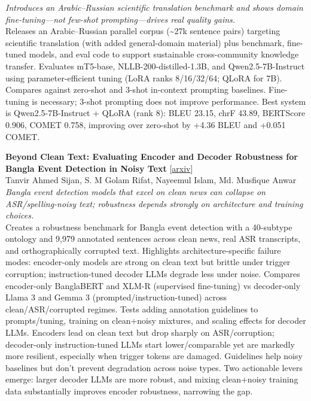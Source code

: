 \documentclass[12pt,letterpaper]{article}
\begin{document}
{\small\textit{Introduces an Arabic--Russian scientific translation benchmark and shows domain fine-tuning---not few-shot prompting---drives real quality gains.}}\\[1pt]
{\footnotesize Releases an Arabic--Russian parallel corpus (\textasciitilde{}27k sentence pairs) targeting scientific translation (with added general-domain material) plus benchmark, fine-tuned models, and eval code to support sustainable cross-community knowledge transfer. Evaluates mT5-base, NLLB-200-distilled-1.3B, and Qwen2.5-7B-Instruct using parameter-efficient tuning (LoRA ranks 8/16/32/64; QLoRA for 7B). Compares against zero-shot and 3-shot in-context prompting baselines. Fine-tuning is necessary; 3-shot prompting does not improve performance. Best system is Qwen2.5-7B-Instruct + QLoRA (rank 8): BLEU 23.15, chrF 43.89, BERTScore 0.906, COMET 0.758, improving over zero-shot by +4.36 BLEU and +0.051 COMET.}

\medskip

{\small\textbf{Beyond Clean Text: Evaluating Encoder and Decoder Robustness for Bangla Event Detection in Noisy Text}} {\scriptsize[\href{https://arxiv.org/abs/2606.30914}{arxiv}]}\\
{\scriptsize Tanvir Ahmed Sijan, S. M Golam Rifat, Nayeemul Islam, Md. Musfique Anwar}\\

{\small\textit{Bangla event detection models that excel on clean news can collapse on ASR/spelling-noisy text; robustness depends strongly on architecture and training choices.}}\\[1pt]
{\footnotesize Creates a robustness benchmark for Bangla event detection with a 40-subtype ontology and 9,979 annotated sentences across clean news, real ASR transcripts, and orthographically corrupted text. Highlights architecture-specific failure modes: encoder-only models are strong on clean text but brittle under trigger corruption; instruction-tuned decoder LLMs degrade less under noise. Compares encoder-only BanglaBERT and XLM-R (supervised fine-tuning) vs decoder-only Llama 3 and Gemma 3 (prompted/instruction-tuned) across clean/ASR/corrupted regimes. Tests adding annotation guidelines to prompts/tuning, training on clean+noisy mixtures, and scaling effects for decoder LLMs. Encoders lead on clean text but drop sharply on ASR/corruption; decoder-only instruction-tuned LLMs start lower/comparable yet are markedly more resilient, especially when trigger tokens are damaged. Guidelines help noisy baselines but don't prevent degradation across noise types. Two actionable levers emerge: larger decoder LLMs are more robust, and mixing clean+noisy training data substantially improves encoder robustness, narrowing the gap.}
\end{document}
